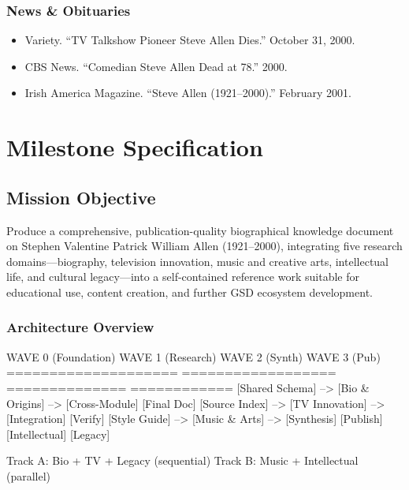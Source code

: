 \documentclass[11pt,letterpaper]{article}
\newcommand{\stageheader}[2]{%
  \noindent\colorbox{#2}{\makebox[\textwidth][l]{%
    \textcolor{white}{\bfseries\sffamily\hspace{6pt}#1\hspace{6pt}}}}%
  \vspace{0.5em}\par%
}
\begin{document}
\subsubsection{News \& Obituaries}
\begin{itemize}[leftmargin=2em]
\item Variety. ``TV Talkshow Pioneer Steve Allen Dies.'' October 31, 2000.
\item CBS News. ``Comedian Steve Allen Dead at 78.'' 2000.
\item Irish America Magazine. ``Steve Allen (1921--2000).'' February 2001.
\end{itemize}

\newpage

\stageheader{STAGE 3 --- MISSION PACKAGE}{tertiary}

\section{Milestone Specification}

\subsection{Mission Objective}

Produce a comprehensive, publication-quality biographical knowledge document on Stephen Valentine Patrick William Allen (1921--2000), integrating five research domains---biography, television innovation, music and creative arts, intellectual life, and cultural legacy---into a self-contained reference work suitable for educational use, content creation, and further GSD ecosystem development.

\subsubsection{Architecture Overview}

\begin{asciibox}
WAVE 0 (Foundation)     WAVE 1 (Research)      WAVE 2 (Synth)  WAVE 3 (Pub)
====================    ==================     ==============   ============
[Shared Schema]    -->  [Bio & Origins]    --> [Cross-Module]   [Final Doc]
[Source Index]     -->  [TV Innovation]    --> [Integration]    [Verify]
[Style Guide]     -->  [Music & Arts]     --> [Synthesis]      [Publish]
                        [Intellectual]
                        [Legacy]
                        
                        Track A: Bio + TV + Legacy (sequential)
                        Track B: Music + Intellectual (parallel)
\end{asciibox}
\end{document}
